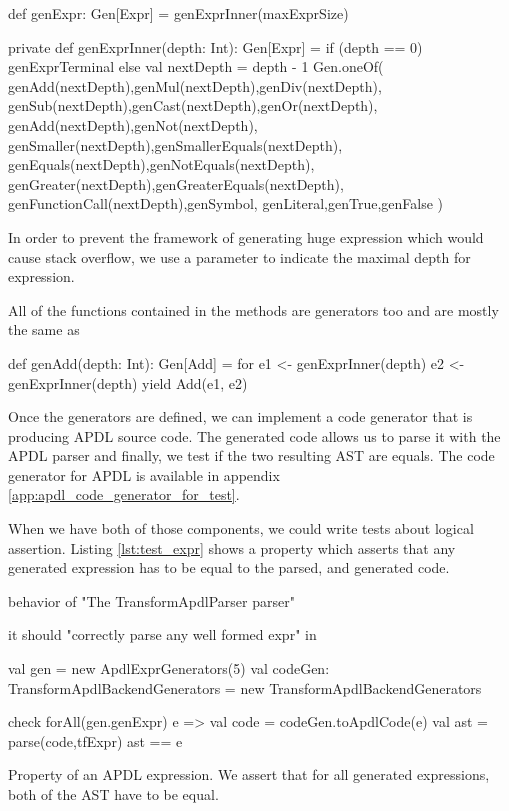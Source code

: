 \begin{inlinescala}
def genExpr: Gen[Expr] = genExprInner(maxExprSize)

private def genExprInner(depth: Int): Gen[Expr] = {
  if (depth == 0) genExprTerminal
  else {
    val nextDepth = depth - 1
    Gen.oneOf(
      genAdd(nextDepth),genMul(nextDepth),genDiv(nextDepth),
      genSub(nextDepth),genCast(nextDepth),genOr(nextDepth),
      genAdd(nextDepth),genNot(nextDepth),
      genSmaller(nextDepth),genSmallerEquals(nextDepth),
      genEquals(nextDepth),genNotEquals(nextDepth),
      genGreater(nextDepth),genGreaterEquals(nextDepth),
      genFunctionCall(nextDepth),genSymbol,
      genLiteral,genTrue,genFalse
    )
  }
}
\end{inlinescala}

In order to prevent the framework of generating huge expression which would cause
stack overflow, we use a parameter to indicate the maximal depth for
expression.

All of the functions contained in the  methods are
generators too and are mostly the same as

\begin{inlinescala}
def genAdd(depth: Int): Gen[Add] =
    for {
      e1 <- genExprInner(depth)
      e2 <- genExprInner(depth)
    } yield Add(e1, e2)
\end{inlinescala}

Once the generators are defined, we can implement a code generator that is
producing \gls{APDL} source code. The generated code allows us to parse it with
the \gls{APDL} parser and finally, we test if the two resulting \gls{AST} are equals.
The code generator for \gls{APDL} is available in appendix
\ref{app:apdl_code_generator_for_test}.

When we have both of those components, we could write tests about logical
assertion. Listing \ref{lst:test_expr} shows a property which asserts that any
generated expression has to be equal to the parsed, and generated code.

\begin{listing}[H]
  \centering
\begin{scalacode}
behavior of "The TransformApdlParser parser"

it should "correctly parse any well formed expr" in {
  val gen = new ApdlExprGenerators(5)
  val codeGen: TransformApdlBackendGenerators = new TransformApdlBackendGenerators {}

  check {
    forAll(gen.genExpr) { e =>
      val code = codeGen.toApdlCode(e)
      val ast = parse(code,tfExpr)
      ast == e
    }
  }
}
\end{scalacode}
  \caption[Property testing of an \gls{APDL} expression]{Property of an
\gls{APDL} expression. We assert that for all generated expressions, both of the
\gls{AST} have to be equal.}
  \label{lst:test_expr}
\end{listing}

